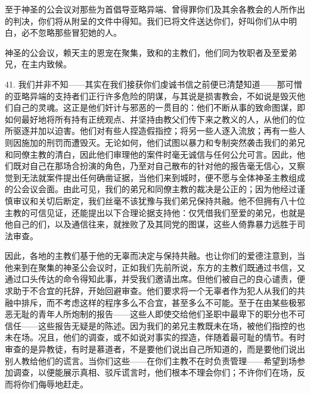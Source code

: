 至于神圣的公会议对那些为首倡导亚略异端、曾得罪你们及其余各教会的人所作出的判决，你们将从附呈的文件中得知。我们已将文件送达你们，好叫你们从中明白，必不忽略那些冒犯她的人。\par

\par

神圣的公会议，赖天主的恩宠在聚集，致和的主教们，他们同为牧职者及至爱弟兄，在主内致候。\par

41. 我们并非不知——其实在我们接获你们虔诚书信之前便已清楚知道——那可憎的亚略异端的支持者们正行许多危险的阴谋，与其说是损害教会，不如说是毁灭他们自己的灵魂。这正是他们奸计与邪恶的一贯目的：他们不断从事的致命图谋，即如何最好地将所有持有正统观点、并坚持由教父们传下来之教义的人，从他们的位所驱逐并加以迫害。他们对有些人捏造假指控；将另一些人逐入流放；再有一些人则因施加的刑罚而遭毁灭。无论如何，他们试图以暴力和专制突然袭击我们的弟兄和同僚主教的清白，因此他们审理他的案件时毫无诚信与任何公允可言。因此，他们既对自己在那场合扮演的角色，乃至对自己散布的针对他的报告毫无信心，又察觉到无法就案件提出任何确凿证据，当他们来到城时，便不愿与全体神圣主教组成的公会议会面。由此可见，我们的弟兄和同僚主教的裁决是公正的；因为他经过谨慎审议和关切后断定，我们丝毫不该犹豫与我们弟兄保持共融。他不但拥有八十位主教的可信见证，还能提出以下合理论据支持他：仅凭借我们至爱的弟兄，也就是他自己的们，以及通信往来，就挫败了及其同党的图谋，这些人倚靠暴力远胜于司法审查。\par

因此，各地的主教们基于他的无辜而决定与保持共融。也让你们的爱德注意到，当他来到在聚集的神圣公会议时，正如我们先前所说，东方的主教们既通过书信，又通过口头传达的命令得知此事，并受我们邀请出席。但他们被自己的良心谴责，便求助于不合宜的托辞，开始回避审查。他们要求将一个无辜者作为犯人从我们的共融中排斥，而不考虑这样的程序多么不合宜，甚至多么不可能。至于在由某些极邪恶无耻的青年人所炮制的报告——这些人即使交给他们圣职中最卑下的职分也不可信任——这些报告无疑是的陈述。因为我们的弟兄主教既未在场，被他们指控的也未在场。况且，他们的调查，或不如说对事实的捏造，伴随着最可耻的情节。有时审查的是异教徒，有时是慕道者，不是要他们说出自己所知道的，而是要他们说出别人教给他们的谎言。当你们这些——在你们主教不在时负责管理——希望到场参加调查，以便能展示真相、驳斥谎言时，他们根本不理会你们；不许你们在场，反而将你们侮辱地赶走。\par

